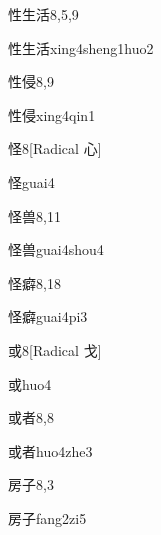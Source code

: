 \begin{entry}{性生活}{8,5,9}
  \begin{phonetics}{性生活}{xing4sheng1huo2}
  \end{phonetics}
\end{entry}

\begin{entry}{性侵}{8,9}
  \begin{phonetics}{性侵}{xing4qin1}
  \end{phonetics}
\end{entry}

\begin{entry}{怪}{8}[Radical 心]
  \begin{phonetics}{怪}{guai4}
  \end{phonetics}
\end{entry}

\begin{entry}{怪兽}{8,11}
  \begin{phonetics}{怪兽}{guai4shou4}
  \end{phonetics}
\end{entry}

\begin{entry}{怪癖}{8,18}
  \begin{phonetics}{怪癖}{guai4pi3}
  \end{phonetics}
\end{entry}

\begin{entry}{或}{8}[Radical 戈]
  \begin{phonetics}{或}{huo4}
  \end{phonetics}
\end{entry}

\begin{entry}{或者}{8,8}
  \begin{phonetics}{或者}{huo4zhe3}
  \end{phonetics}
\end{entry}

\begin{entry}{房子}{8,3}
  \begin{phonetics}{房子}{fang2zi5}
  \end{phonetics}
\end{entry}

